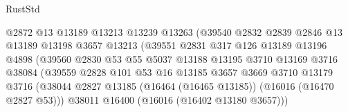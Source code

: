 \begin{lexlean}{RustStd}
\begin{coremodule}
                                      @2872
                                      @13
                                      @13189
                                      @13213
                                      @13239
                                      @13263
                                      (@39540
                                        @2832
                                        @2839
                                        @2846
                                        @13
                                        @13189
                                        @13198
                                        @3657
                                        @13213
                                        (@39551
                                          @2831
                                          @317
                                          @126
                                          @13189
                                          @13196
                                          @4898
                                          (@39560
                                            @2830
                                            @53
                                            @55
                                            @5037
                                            @13188
                                            @13195
                                            @3710
                                            @13169
                                            @3716
                                            @38084
                                            (@39559
                                              @2828
                                              @101
                                              @53
                                              @16
                                              @13185
                                              @3657
                                              @3669
                                              @3710
                                              @13179
                                              @3716
                                              (@38044
                                                @2827
                                                @13185
                                                (@16464 (@16465 @13185))
                                                (@16016 (@16470 @2827 @53)))
                                              @38011
                                              @16400
                                              (@16016 (@16402 @13180 @3657)))

\end{coremodule}
\end{lexlean}
